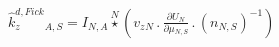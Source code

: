 \documentclass[border=2pt]{standalone}
\begin{document}
${{\hat{k}^{d,Fick}_z}}{_{A, S}}={{I}}{_{N, A}} \stackrel{N}{\star} \left({{v_z}}{_{N}} \, . \, \frac{\partial{{U}{_{N}}}}{\partial{{{\mu}}{_{N, S}}}} \, . \, \left( {n}{_{N, S}} \right)^{-1}\right)$
\end{document}
